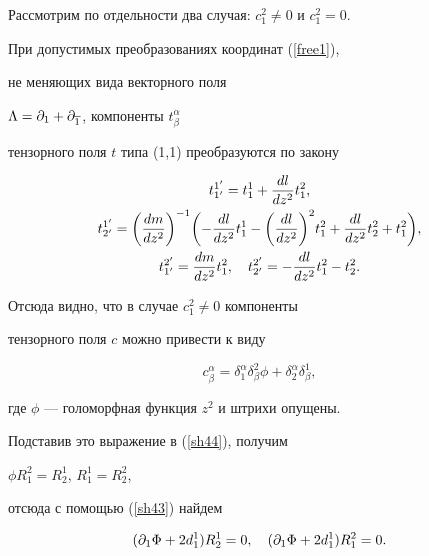 Рассмотрим по отдельности два случая: $c^2_1 \neq 0$ и $c^2_1 =0$.


При допустимых преобразованиях координат (\ref{free1}),


не меняющих вида векторного поля


$\Lambda = \partial_1 +\partial_{\overline 1}$, компоненты $t^\alpha_\beta$


тензорного поля $t$ типа (1,1) преобразуются по закону


\begin{gather}


t^{1'}_{1'} =t^1_1 + \frac{dl}{dz^2} t^2_1,\notag\\


\label{sh45}


t^{1'}_{2'} =\biggl(\frac{dm}{dz^2}\biggr)^{-1}


\biggl(-\frac{dl}{dz^2} t^1_1


- \biggl(\frac{dl}{dz^2}\biggr)^2 t^2_1


+ \frac{dl}{dz^2} t^2_2 +t^2_1\biggr),\\


t^{2'}_{1'} = \frac{dm}{dz^2} t^2_1,


\quad t^{2'}_{2'} = -\frac{dl}{dz^2} t^2_1 - t^2_2.\notag


\end{gather}





Отсюда видно, что в случае $c^2_1 \ne 0$ компоненты


тензорного поля $c$ можно привести к виду


$$


c^{\alpha}_{\beta} = \delta^{\alpha}_1 \delta^2_{\beta} \phi+


\delta^{\alpha}_2 \delta^1_{\beta},


$$


где $\phi$ --- голоморфная функция $z^2$ и штрихи опущены.


Подставив это выражение в (\ref{sh44}), получим


$\phi R^{2}_{1} =R^{1}_{2}$, $R^{1}_{1} =R^{2}_{2}$,


отсюда с помощью (\ref{sh43}) найдем


$$


(\pl{1} \Phi +2d^{1}_{1}) R^{1}_{2} =0, \quad


(\pl{1} \Phi +2d^{1}_{1}) R^{2}_{1} =0.


$$





